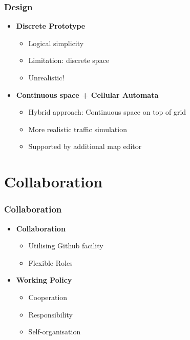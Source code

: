 \documentclass{beamer}
\begin{document}
\begin{frame}
\frametitle{Design}

\begin{itemize}
\item \textbf{Discrete Prototype}
	\begin{itemize}
		\item Logical simplicity
		\item Limitation: discrete space 
		\item Unrealistic!
	\end{itemize}
\item \textbf{Continuous space + Cellular Automata}
	\begin{itemize}
		\item Hybrid approach: Continuous space on top of grid
		\item More realistic traffic simulation 
		\item Supported by additional map editor
	\end{itemize}
	
\end{itemize}

\end{frame}


\section{Collaboration}

\begin{frame}
\frametitle{Collaboration}

\begin{itemize}
\item \textbf{Collaboration}
	\begin{itemize}
		\item Utilising Github facility 
		\item Flexible Roles
	\end{itemize}
	
\item \textbf{Working Policy}
	\begin{itemize}
		\item Cooperation 
		\item Responsibility 
		\item Self-organisation
	\end{itemize}
\end{itemize}
\end{frame}
\end{document}
